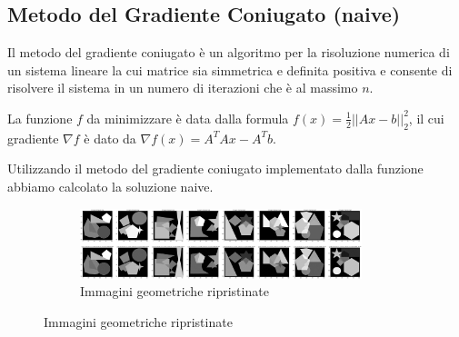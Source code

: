 \subsection{Metodo del Gradiente Coniugato (naive)}
Il metodo del gradiente coniugato è un algoritmo per la risoluzione numerica di un sistema lineare la cui matrice sia simmetrica e definita positiva
 e consente di risolvere il sistema in un numero di iterazioni che è al massimo $n$.

La funzione $f$ da minimizzare è data dalla formula
  $f(x) = \frac{1}{2} ||Ax - b||_2^2 $, il cui gradiente $\nabla f$ è dato da
$\nabla f(x) = A^TAx - A^Tb  $.

Utilizzando il metodo del gradiente coniugato implementato dalla funzione 
 abbiamo calcolato la soluzione naive.

\begin{figure}[H]
  \centering
  \begin{subfigure}{0.9\textwidth}
    \centering
    \includegraphics[width=0.9\textwidth]{imgRel/datasetconiugato.png}
    \caption{Immagini geometriche ripristinate}
    \label{fig:geomripristinate}
  \end{subfigure}


\end{figure}
